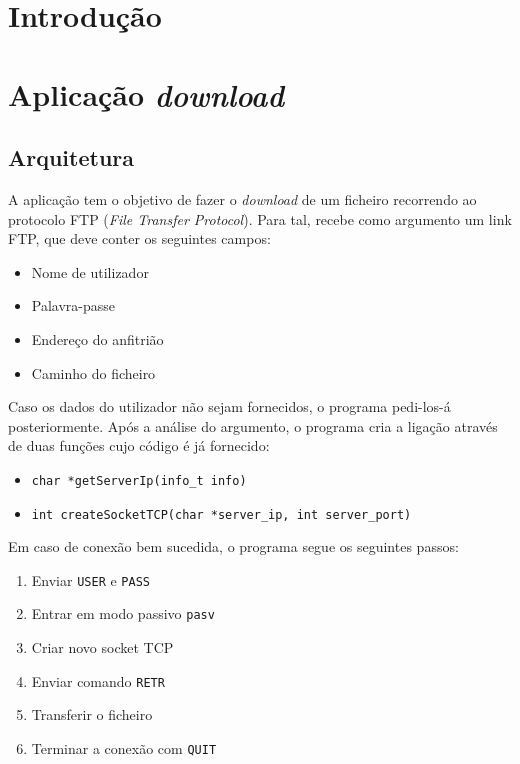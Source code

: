 \documentclass{article}
\begin{document}
\tableofcontents
\clearpage
 
\section{Introdução}
\section{Aplicação \textit{download}}
\subsection{Arquitetura}

A aplicação tem o objetivo de fazer o \textit{download} de um ficheiro recorrendo ao protocolo
FTP (\textit{File Transfer Protocol}). Para tal, recebe como argumento um link FTP, que deve conter
os seguintes campos:

\begin{itemize}
\item Nome de utilizador
\item Palavra-passe
\item Endereço do anfitrião
\item Caminho do ficheiro
\end{itemize}

Caso os dados do utilizador não sejam fornecidos, o programa pedi-los-á posteriormente.
Após a análise do argumento, o programa cria a ligação através de duas funções cujo código 
é já fornecido:

\begin{itemize}
\item \texttt{char *getServerIp(info_t info)}
\item \texttt{int createSocketTCP(char *server_ip, int server_port)}
\end{itemize}

Em caso de conexão bem sucedida, o programa segue os seguintes passos:
\begin{enumerate}
\item Enviar \texttt{USER} e \texttt{PASS}
\item Entrar em modo passivo \texttt{pasv}
\item Criar novo socket TCP
\item Enviar comando \texttt{RETR}
\item Transferir o ficheiro
\item Terminar a conexão com \texttt{QUIT}
\end{enumerate}
\end{document}
